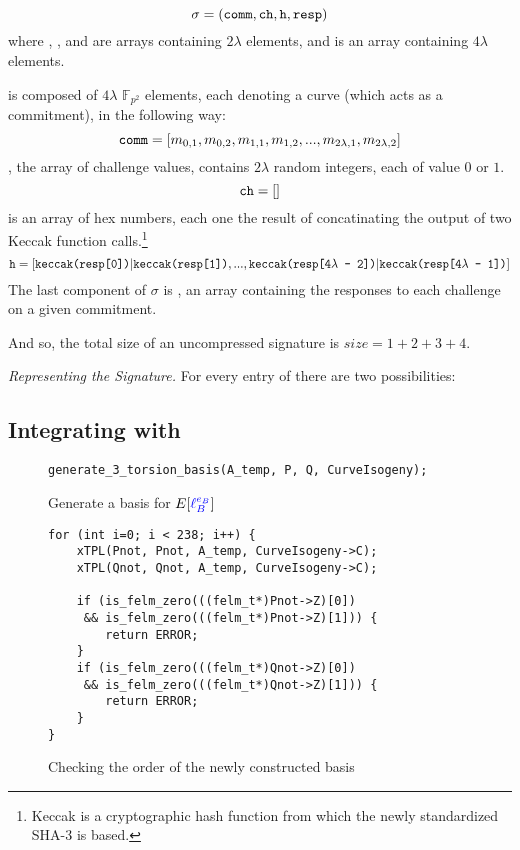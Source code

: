 $$
\sigma = (\texttt{comm}, \texttt{ch}, \texttt{h}, \texttt{resp})
$$
where , , and  are arrays containing $2\lambda$ elements, and  is an array containing $4\lambda$ elements. 

 is composed of $4\lambda$ $\mathbb{F}_{p^2}$ elements, each denoting a curve (which acts as a commitment), in the following way:
$$
\texttt{comm} = [m_{0, 1}, m_{0, 2}, m_{1, 1}, m_{1, 2}, ... , m_{2\lambda, 1}, m_{2\lambda, 2}]
$$
, the array of challenge values, contains $2\lambda$ random integers, each of value $0$ or $1$. 
$$
\texttt{ch} = []
$$
 is an array of hex numbers, each one the result of concatinating the output of two Keccak function calls.\footnote{Keccak is a cryptographic hash function from which the newly standardized SHA-3 is based.} 
$$
\texttt{h} = [\texttt{keccak(resp[0])}|\texttt{keccak(resp[1])}, ... , \texttt{keccak(resp[4}\lambda\texttt{ - 2])}|\texttt{keccak(resp[4}\lambda\texttt{ - 1])}]
$$
The last component of $\sigma$ is , an array containing the responses to each challenge on a given commitment. 

And so, the total size of an uncompressed signature is $size = 1 + 2 + 3 + 4$.

\textit{Representing the Signature.} For every entry of  there are two possibilities: 


\subsection{Integrating with \sidh}

\begin{figure}[!h]
\begin{lstlisting}
generate_3_torsion_basis(A_temp, P, Q, CurveIsogeny);
\end{lstlisting}
\caption{Generate a basis for $E[\textcolor{blue}{\ell_{B}^{e_B}}]$}
\label{code:sigstruct}
\end{figure}

\begin{figure}[!h]
\begin{lstlisting}
for (int i=0; i < 238; i++) {
	xTPL(Pnot, Pnot, A_temp, CurveIsogeny->C);
	xTPL(Qnot, Qnot, A_temp, CurveIsogeny->C);

	if (is_felm_zero(((felm_t*)Pnot->Z)[0]) 
	 && is_felm_zero(((felm_t*)Pnot->Z)[1])) {
		return ERROR;
	}
	if (is_felm_zero(((felm_t*)Qnot->Z)[0]) 
	 && is_felm_zero(((felm_t*)Qnot->Z)[1])) {
		return ERROR;
	}
}
\end{lstlisting}
\caption{Checking the order of the newly constructed basis}
\label{code:checkorder}
\end{figure}

